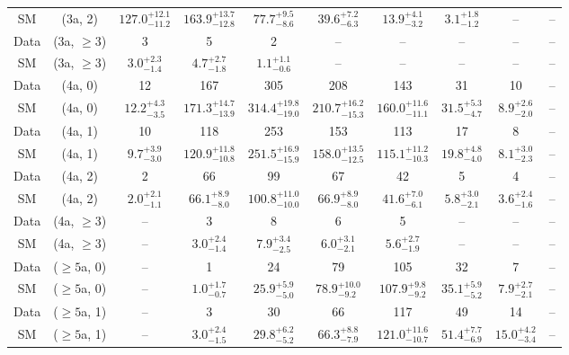 \begin{table}[h!]
{\begin{tabular}{cccccccccc}
	SM & (3a, 2) & $127.0^{+ 12.1 }_{- 11.2 }$ & $163.9^{+ 13.7 }_{- 12.8 }$ & $77.7^{+ 9.5 }_{- 8.6 }$ & $39.6^{+ 7.2 }_{- 6.3 }$ & $13.9^{+ 4.1 }_{- 3.2 }$ & $3.1^{+ 1.8 }_{- 1.2 }$ & -- & -- \\[0.5ex] 
	Data & (3a, $\ge3$) & 3 & 5 & 2 & -- & -- & -- & -- & -- \\[0.5ex] 
	SM & (3a, $\ge3$) & $3.0^{+ 2.3 }_{- 1.4 }$ & $4.7^{+ 2.7 }_{- 1.8 }$ & $1.1^{+ 1.1 }_{- 0.6 }$ & -- & -- & -- & -- & -- \\[0.5ex] 
	Data & (4a, 0) & 12 & 167 & 305 & 208 & 143 & 31 & 10 & -- \\[0.5ex] 
	SM & (4a, 0) & $12.2^{+ 4.3 }_{- 3.5 }$ & $171.3^{+ 14.7 }_{- 13.9 }$ & $314.4^{+ 19.8 }_{- 19.0 }$ & $210.7^{+ 16.2 }_{- 15.3 }$ & $160.0^{+ 11.6 }_{- 11.1 }$ & $31.5^{+ 5.3 }_{- 4.7 }$ & $8.9^{+ 2.6 }_{- 2.0 }$ & -- \\[0.5ex] 
	Data & (4a, 1) & 10 & 118 & 253 & 153 & 113 & 17 & 8 & -- \\[0.5ex] 
	SM & (4a, 1) & $9.7^{+ 3.9 }_{- 3.0 }$ & $120.9^{+ 11.8 }_{- 10.8 }$ & $251.5^{+ 16.9 }_{- 15.9 }$ & $158.0^{+ 13.5 }_{- 12.5 }$ & $115.1^{+ 11.2 }_{- 10.3 }$ & $19.8^{+ 4.8 }_{- 4.0 }$ & $8.1^{+ 3.0 }_{- 2.3 }$ & -- \\[0.5ex] 
	Data & (4a, 2) & 2 & 66 & 99 & 67 & 42 & 5 & 4 & -- \\[0.5ex] 
	SM & (4a, 2) & $2.0^{+ 2.1 }_{- 1.1 }$ & $66.1^{+ 8.9 }_{- 8.0 }$ & $100.8^{+ 11.0 }_{- 10.0 }$ & $66.9^{+ 8.9 }_{- 8.0 }$ & $41.6^{+ 7.0 }_{- 6.1 }$ & $5.8^{+ 3.0 }_{- 2.1 }$ & $3.6^{+ 2.4 }_{- 1.6 }$ & -- \\[0.5ex] 
	Data & (4a, $\ge3$) & -- & 3 & 8 & 6 & 5 & -- & -- & -- \\[0.5ex] 
	SM & (4a, $\ge3$) & -- & $3.0^{+ 2.4 }_{- 1.4 }$ & $7.9^{+ 3.4 }_{- 2.5 }$ & $6.0^{+ 3.1 }_{- 2.1 }$ & $5.6^{+ 2.7 }_{- 1.9 }$ & -- & -- & -- \\[0.5ex] 
	Data & ($\ge5$a, 0) & -- & 1 & 24 & 79 & 105 & 32 & 7 & -- \\[0.5ex] 
	SM & ($\ge5$a, 0) & -- & $1.0^{+ 1.7 }_{- 0.7 }$ & $25.9^{+ 5.9 }_{- 5.0 }$ & $78.9^{+ 10.0 }_{- 9.2 }$ & $107.9^{+ 9.8 }_{- 9.2 }$ & $35.1^{+ 5.9 }_{- 5.2 }$ & $7.9^{+ 2.7 }_{- 2.1 }$ & -- \\[0.5ex] 
	Data & ($\ge5$a, 1) & -- & 3 & 30 & 66 & 117 & 49 & 14 & -- \\[0.5ex] 
	SM & ($\ge5$a, 1) & -- & $3.0^{+ 2.4 }_{- 1.5 }$ & $29.8^{+ 6.2 }_{- 5.2 }$ & $66.3^{+ 8.8 }_{- 7.9 }$ & $121.0^{+ 11.6 }_{- 10.7 }$ & $51.4^{+ 7.7 }_{- 6.9 }$ & $15.0^{+ 4.2 }_{- 3.4 }$ & -- \\[0.5ex] 

\end{tabular}}
\end{table}
